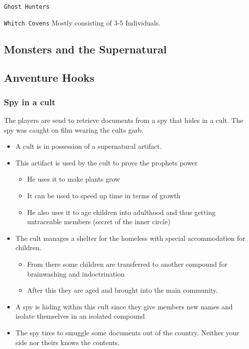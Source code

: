 \documentclass[11pt]{article}
\begin{document}
{\texttt{Ghost Hunters}

\texttt{Whitch Covens}
Mostly consisting of 3-5 Individuals.

\subsection{Monsters and the Supernatural}
\label{sec:org874f01f}

\subsection{Anventure Hooks}
\label{sec:org07e3a0c}
\subsubsection{Spy in a cult}
\label{sec:org41d5bb1}

The players are send to retrieve documents from a spy that hides in a cult. The spy was caught on film wearing the cults garb. 

\begin{itemize}
\item A cult is in possession of a supernatural artifact.
\item This artifact is used by the cult to prove the prophets power
\begin{itemize}
\item He uses it to make plants grow
\item It can be used to speed up time in terms of growth
\item He also uses it to age children into adulthood and thus getting untraceable members (secret of the inner circle)
\end{itemize}
\item The cult manages a shelter for the homeless with special accommodation for children.
\begin{itemize}
\item From there some children are transferred to another compound for brainwashing and indoctrination
\item After this they are aged and brought into the main community.
\end{itemize}
\item A spy is hiding within this cult since they give members new names and isolate themselves in an isolated compound
\item The spy tires to smuggle some documents out of the country. Neither your side nor theirs knows the contents.
\end{itemize}

}
\end{document}
